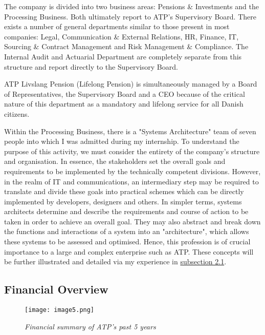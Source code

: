 The company is divided into two business areas: Pensions \& Investments and the
Processing Business. Both ultimately report to ATP’s Supervisory Board. There
exists a number of general departments similar to those present in most
companies: Legal, Communication \& External Relations, HR, Finance, IT, Sourcing
\& Contract Management and Risk Management \& Compliance. The Internal Audit and
Actuarial Department are completely separate from this structure and report
directly to the Supervisory Board.\cite{about_atp}

ATP Livslang Pension (Lifelong Pension) is simultaneously managed by a Board of
Representatives, the Supervisory Board and a CEO because of the critical nature
of this department as a mandatory and lifelong service for all Danish
citizens.\cite{about_atp,anno_report}

Within the Processing Business, there is a "Systems Architecture" team of seven
people into which I was admitted during my internship. To understand the purpose
of this activity, we must consider the entirety of the company's structure and
organisation. In essence, the stakeholders set the overall goals and
requirements to be implemented by the technically competent divisions. However,
in the realm of IT and communications, an intermediary step may be required to
translate and divide these goals into practical schemes which can be directly
implemented by developers, designers and others. In simpler terms, systems
architects determine and describe the requirements and course of action to be
taken in order to achieve an overall goal. They may also abstract and break down
the functions and interactions of a system into an "architecture", which allows
these systems to be assessed and optimised.\cite{sys_arch} Hence, this
profession is of crucial importance to a large and complex enterprise such as
ATP. These concepts will be further illustrated and detailed via my experience
in \hyperlink{subsection.2.1}{subsection 2.1}.

\subsection{Financial Overview}

\begin{figure}[H]
    \centering
        \texttt{[image: image5.png]}
        \caption*{\textit{Financial summary of ATP's past 5
        years\cite{anno_report}}}
\end{figure}

